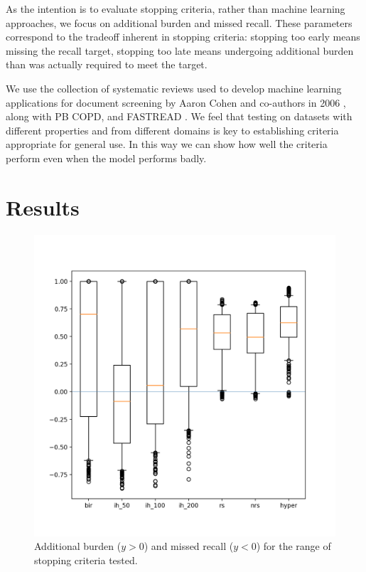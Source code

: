 \documentclass{bmcart}
\begin{document}
	As the intention is to evaluate stopping criteria, rather than machine learning approaches, we focus on additional burden and missed recall. These parameters correspond to the tradeoff inherent in stopping criteria: stopping too early means missing the recall target, stopping too late means undergoing additional burden than was actually required to meet the target.
	
	
	
	
	We use the collection of systematic reviews used to develop machine learning applications for document screening by Aaron Cohen and co-authors in 2006 \cite{Cohen2006}, along with PB COPD, and FASTREAD . We feel that testing on datasets with different properties and from different domains is key to establishing criteria appropriate for general use. In this way we can show how well the criteria perform even when the model performs badly.
	
	\section*{Results}
	
	\begin{figure}
		\includegraphics[width=\linewidth]{../images/burden_vs_misrecall}
		\caption{Additional burden ($y > 0$) and missed recall ($ y < 0 $) for the range of stopping criteria tested.}
		\label{additional-burden-missed-recall}
	\end{figure}
\end{document}
